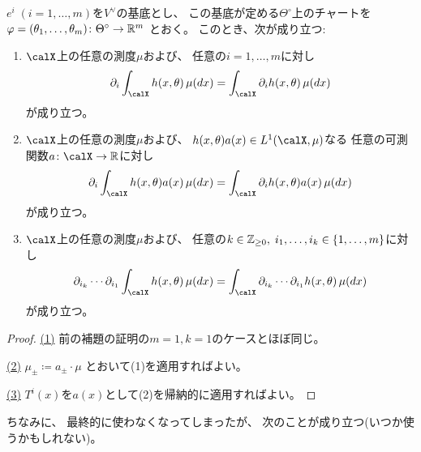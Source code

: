 \documentclass[report]{jlreq}
\begin{document}
\begin{lemma}
    $e^i \; (i = 1, \dots, m)$を$V^\vee$の基底とし、
    この基底が定める$\Theta^\circ$上のチャートを
    $\varphi = (\theta_1, \dots, \theta_m) \colon \Theta^\circ \to \mathbb{R}^m$
    とおく。
    このとき、次が成り立つ:
    \begin{enumerate}
        \item $\calX$上の任意の測度$\mu$および、
            任意の$i = 1, \dots, m$に対し
            \begin{equation}
                \del_i \int_\calX h(x, \theta) \, \mu(dx)
                    = \int_\calX \del_i h(x, \theta) \, \mu(dx)
            \end{equation}
            が成り立つ。
        \item $\calX$上の任意の測度$\mu$および、
            $h(x, \theta) a(x) \in L^1(\calX, \mu)$なる
            任意の可測関数$a \colon \calX \to \R$に対し
            \begin{equation}
                \del_i \int_\calX h(x, \theta) a(x) \, \mu(dx)
                    = \int_\calX \del_i h(x, \theta) a(x) \, \mu(dx)
            \end{equation}
            が成り立つ。
        \item $\calX$上の任意の測度$\mu$および、
            任意の$k \in \mathbb{Z}_{\ge 0}, \;
                i_1, \dots, i_k \in \{ 1, \dots, m \}$に対し
            \begin{equation}
                \del_{i_k} \cdots \del_{i_1}
                    \int_\calX h(x, \theta)
                    \, \mu(dx)
                    = \int_\calX
                        \del_{i_k} \cdots \del_{i_1} h(x, \theta)
                        \, \mu(dx)
            \end{equation}
            が成り立つ。
    \end{enumerate}
\end{lemma}

\begin{proof}
    \uline{(1)} \quad
    前の補題の証明の$m = 1, k = 1$のケースとほぼ同じ。

    \uline{(2)} \quad
    $\mu_{\pm} \coloneqq a_{\pm} \cdot \mu$
    とおいて(1)を適用すればよい。

    \uline{(3)} \quad
    $T^i(x)$を$a(x)$として(2)を帰納的に適用すればよい。
\end{proof}

ちなみに、
最終的に使わなくなってしまったが、
次のことが成り立つ(いつか使うかもしれない)。
\end{document}
